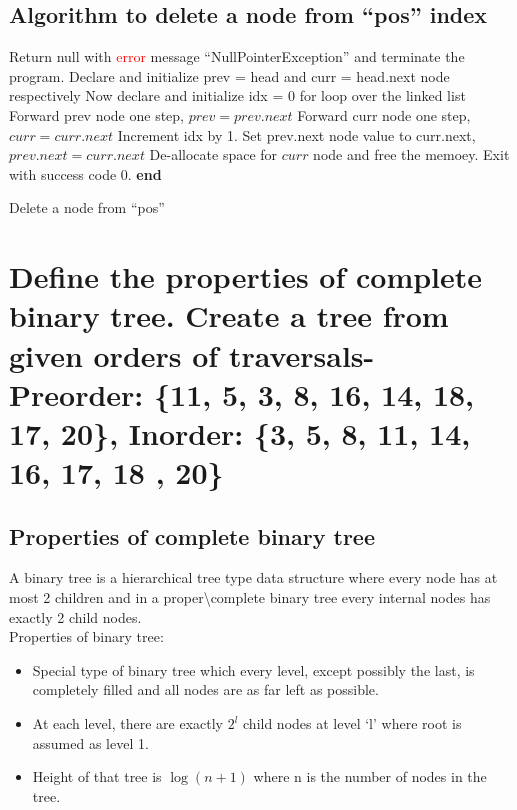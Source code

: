 \documentclass[11 pt]{article}
\begin{document}
\subsection{Algorithm to delete a node from \enquote{pos} index}
\begin{algorithm}
\DontPrintSemicolon
{}
\Begin
{
{
	Return null with \textcolor{red}{error} message \enquote{NullPointerException} and terminate the program.
}
Declare and initialize prev = head and curr = head.next node respectively\;
Now declare and initialize idx = 0 for loop over the linked list\;
{
	Forward prev node one step, $prev = prev.next$\;
	Forward curr node one step, $curr = curr.next$\;
	Increment idx by 1.
}
Set prev.next node value to curr.next, $prev.next = curr.next$\;
De-allocate space for $curr$ node and free the memoey.\;
Exit with success code 0.
}
\textbf{end}

\caption{Delete a node from \enquote{pos}}
\end{algorithm}

\pagebreak

\section{Define the properties of complete binary tree. Create a tree from given orders of traversals- Preorder: \{11, 5, 3, 8, 16, 14, 18, 17, 20\}, Inorder: \{3, 5, 8, 11, 14, 16, 17, 18 , 20\}}

\subsection{Properties of complete binary tree}
A binary tree is a hierarchical tree type data structure where every node has at most 2 children and in a proper\textbackslash complete binary tree every internal nodes has exactly 2 child nodes. \\
Properties of binary tree:
\begin{itemize}
	\item Special type of binary tree which every level, except possibly the last, is completely filled and all nodes are as far left as possible.
	\item At each level, there are exactly $2^l$ child nodes at level \enquote*{l} where root is assumed as level 1.
	\item Height of that tree is $\log(n+1)$ where n is the number of nodes in the tree.
\end{itemize}
\end{document}
